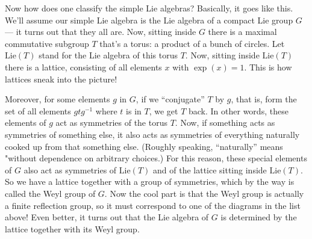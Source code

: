 \documentclass{article}
\begin{document}
Now how does one classify the simple Lie algebras? Basically, it goes
like this. We'll assume our simple Lie algebra is the Lie algebra of a
compact Lie group \(G\) --- it turns out that they all are. Now, sitting
inside \(G\) there is a maximal commutative subgroup \(T\) that's a
torus: a product of a bunch of circles. Let \(\mathrm{Lie}(T)\) stand
for the Lie algebra of this torus \(T\). Now, sitting inside
\(\mathrm{Lie}(T)\) there is a lattice, consisting of all elements \(x\)
with \(\exp(x) = 1\). This is how lattices sneak into the picture!

Moreover, for some elements \(g\) in \(G\), if we ``conjugate'' \(T\) by
\(g\), that is, form the set of all elements \(gtg^{-1}\) where \(t\) is
in \(T\), we get \(T\) back. In other words, these elements of \(g\) act
as symmetries of the torus \(T\). Now, if something acts as symmetries
of something else, it also acts as symmetries of everything naturally
cooked up from that something else. (Roughly speaking, ``naturally''
means "without dependence on arbitrary choices.) For this reason, these
special elements of \(G\) also act as symmetries of \(\mathrm{Lie}(T)\)
and of the lattice sitting inside \(\mathrm{Lie}(T)\). So we have a
lattice together with a group of symmetries, which by the way is called
the Weyl group of \(G\). Now the cool part is that the Weyl group is
actually a finite reflection group, so it must correspond to one of the
diagrams in the list above! Even better, it turns out that the Lie
algebra of \(G\) is determined by the lattice together with its Weyl
group.
\end{document}
